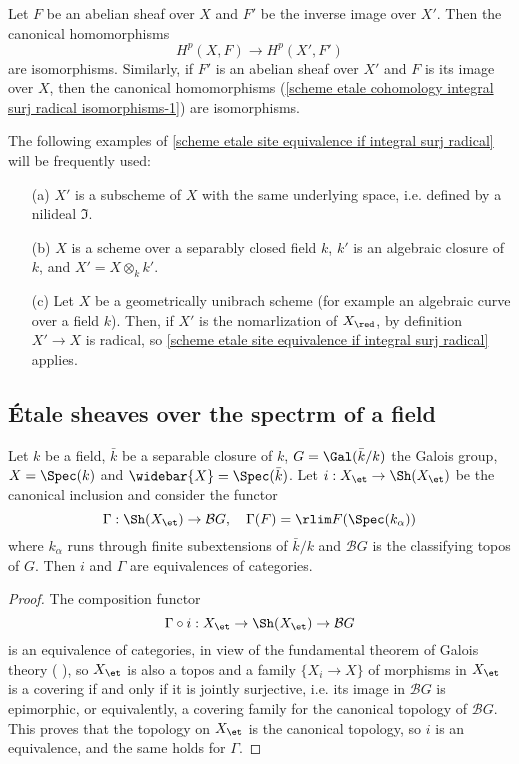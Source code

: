 \begin{corollary}\label{scheme etale cohomology integral surj radical isomorphisms}
Let $F$ be an abelian sheaf over $X$ and $F'$ be the inverse image over $X'$. Then the canonical homomorphisms
\begin{equation}\label{scheme etale cohomology integral surj radical isomorphisms-1}
H^p(X,F)\to H^p(X',F')
\end{equation}
are isomorphisms. Similarly, if $F'$ is an abelian sheaf over $X'$ and $F$ is its image over $X$, then the canonical homomorphisms (\ref{scheme etale cohomology integral surj radical isomorphisms-1}) are isomorphisms.
\end{corollary}

\begin{example}\label{scheme etale integral surj radical eg}
The following examples of \cref{scheme etale site equivalence if integral surj radical} will be frequently used:
\begin{enumerate}
    \item[(a)] $X'$ is a subscheme of $X$ with the same underlying space, i.e. defined by a nilideal $\mathfrak{I}$.
    \item[(b)] $X$ is a scheme over a separably closed field $k$, $k'$ is an algebraic closure of $k$, and $X'=X\otimes_kk'$.
    \item[(c)] Let $X$ be a geometrically unibrach scheme (for example an algebraic curve over a field $k$). Then, if $X'$ is the nomarlization of $X_\red$, by definition $X'\to X$ is radical, so \cref{scheme etale site equivalence if integral surj radical} applies. 
\end{enumerate}
\end{example}

\subsection{\'Etale sheaves over the spectrm of a field}
\begin{proposition}\label{scheme etale topos of field equivalent to pi-set}
Let $k$ be a field, $\bar{k}$ be a separable closure of $k$, $G=\Gal(\bar{k}/k)$ the Galois group, $X=\Spec(k)$ and $\widebar{X}=\Spec(\bar{k})$. Let $i:X_\et\to\Sh(X_\et)$ be the canonical inclusion and consider the functor
\[\Gamma:\Sh(X_\et)\to \mathcal{B}G,\quad \Gamma(F)=\rlim F(\Spec(k_\alpha))\]
where $k_\alpha$ runs through finite subextensions of $\bar{k}/k$ and $\mathcal{B}G$ is the classifying topos of $G$. Then $i$ and $\Gamma$ are equivalences of categories.
\end{proposition}
\begin{proof}
The composition functor
\[\Gamma\circ i:X_\et\to\Sh(X_\et)\to \mathcal{B}G\]
is an equivalence of categories, in view of the fundamental theorem of Galois theory (\cite{SGA1} ), so $X_\et$ is also a topos and a family $\{X_i\to X\}$ of morphisms in $X_\et$ is a covering if and only if it is jointly surjective, i.e. its image in $\mathcal{B}G$ is epimorphic, or equivalently, a covering family for the canonical topology of $\mathcal{B}G$. This proves that the topology on $X_\et$ is the canonical topology, so $i$ is an equivalence, and the same holds for $\Gamma$.
\end{proof}

